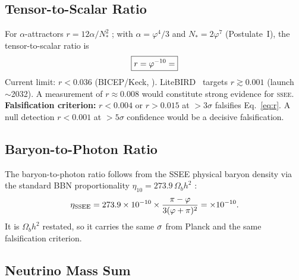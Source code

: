 \documentclass[12pt,a4paper]{article}
\newcommand{\SSEE}{\ifmmode\mathrm{SSEE}\else\textsc{ssee}\fi}
\begin{document}
\subsection{Tensor-to-Scalar Ratio}
\label{sec:r}

For $\alpha$-attractors $r=12\alpha/N_*^2$ \citep{Kallosh2013}; with $\alpha=\varphi^4/3$ and
$N_*=2\varphi^7$ (Postulate~I), the tensor-to-scalar ratio is
\begin{equation}
\boxed{r = \varphi^{-10} = \val{R_TENSOR_d6}}
\label{eq:r}
\end{equation}
Current limit: $r<0.036$ (BICEP/Keck, \citep{BICEPKeck2021}).
LiteBIRD~\citep{LiteBIRD2023} targets $r\gtrsim0.001$ (launch~$\sim$2032).
A measurement of $r\approx0.008$ would constitute strong evidence for \SSEE.
\textbf{Falsification criterion:} $r < 0.004$ or $r > 0.015$ at $>3\sigma$ falsifies Eq.~\eqref{eq:r}.
A null detection $r<0.001$ at $>5\sigma$ confidence would be a decisive falsification.

\subsection{Baryon-to-Photon Ratio}

The baryon-to-photon ratio follows from the SSEE physical baryon density via the
standard BBN proportionality $\eta_{10} = 273.9\,\Omega_b h^2$ \citep{Steigman2007}:
\begin{equation}
  \eta_{\rm SSEE} = 273.9\times10^{-10}\times\frac{\pi-\varphi}{3(\varphi+\pi)^2}
    = \val{eta_ssee_d2}\times10^{-10}.
\end{equation}
It is $\Omega_b h^2$ restated, so it carries the same $\val{wb_planck_sig}\sigma$ from Planck and
the same falsification criterion.

\subsection{Neutrino Mass Sum}
\end{document}
